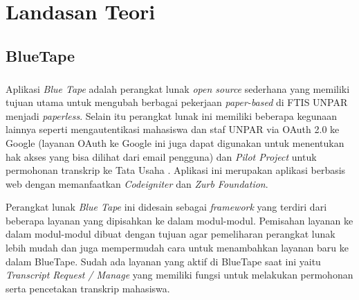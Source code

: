 
\chapter{Landasan Teori}
\label{chap:teori}
\setcounter{secnumdepth}{3}


\section{BlueTape}
\paragraph{} Aplikasi \textit{Blue Tape} adalah perangkat lunak \textit{open source} sederhana yang memiliki tujuan utama untuk mengubah berbagai pekerjaan \textit{paper-based} di FTIS UNPAR menjadi \textit{paperless}. Selain itu perangkat lunak ini memiliki beberapa kegunaan lainnya seperti mengautentikasi mahasiswa dan staf UNPAR via OAuth 2.0 ke Google (layanan OAuth ke Google ini juga dapat digunakan untuk menentukan hak akses yang bisa dilihat dari email pengguna) dan \textit{Pilot Project} untuk permohonan transkrip ke Tata Usaha . Aplikasi ini merupakan aplikasi berbasis web dengan memanfaatkan \textit{Codeigniter} dan \textit{Zurb Foundation}. 

Perangkat lunak \textit{Blue Tape} ini didesain sebagai \textit{framework} yang terdiri dari beberapa layanan yang dipisahkan ke dalam modul-modul. Pemisahan layanan ke dalam modul-modul dibuat dengan tujuan agar pemeliharan perangkat lunak lebih mudah dan juga mempermudah cara untuk menambahkan layanan baru ke dalam BlueTape. Sudah ada layanan yang aktif di BlueTape saat ini yaitu \textit{Transcript Request / Manage} yang memiliki fungsi untuk melakukan permohonan serta pencetakan transkrip mahasiswa.



